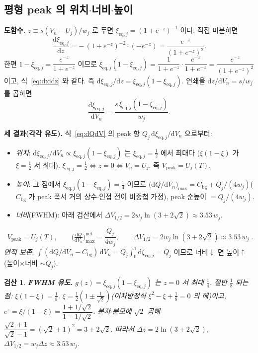 \documentclass[11pt,a4paper]{article}
\newtheorem*{verifybox}{검산}
\newcommand{\dd}{\mathrm{d}}
\newcommand{\eq}{\mathrm{eq}}
\newcommand{\bg}{\mathrm{bg}}
\newcommand{\peak}{\mathrm{peak}}
\begin{document}
\subsection{평형 peak 의 위치$\cdot$너비$\cdot$높이}
\textbf{도함수.} $z\equiv s(V_n-U_j)/w_j$ 로 두면 $\xi_{\eq,j}=(1+e^{-z})^{-1}$ 이다. 직접 미분하면
\begin{equation}
\frac{\dd\xi_{\eq,j}}{\dd z}=-\,(1+e^{-z})^{-2}\cdot(-e^{-z})=\frac{e^{-z}}{(1+e^{-z})^2}.
\label{eq:dxidz}
\end{equation}
한편 $1-\xi_{\eq,j}=\dfrac{e^{-z}}{1+e^{-z}}$ 이므로 $\xi_{\eq,j}(1-\xi_{\eq,j})=\dfrac{1}{1+e^{-z}}\cdot
\dfrac{e^{-z}}{1+e^{-z}}=\dfrac{e^{-z}}{(1+e^{-z})^2}$ 이고, 식~\eqref{eq:dxidz} 와 같다. 즉
$\dd\xi_{\eq,j}/\dd z=\xi_{\eq,j}(1-\xi_{\eq,j})$. 연쇄율 $\dd z/\dd V_n=s/w_j$ 를 곱하면
\begin{equation}
\frac{\dd\xi_{\eq,j}}{\dd V_n}=\frac{s\,\xi_{\eq,j}(1-\xi_{\eq,j})}{w_j}.
\label{eq:dxidV}
\end{equation}

\textbf{세 결과(각각 유도).} 식~\eqref{eq:dQdV} 의 peak 항 $Q_j\,\dd\xi_{\eq,j}/\dd V_n$ 으로부터:
\begin{itemize}[leftmargin=1.6em,itemsep=2pt]
\item \emph{위치}: $\dd\xi_{\eq,j}/\dd V_n\propto\xi_{\eq,j}(1-\xi_{\eq,j})$ 는 $\xi_{\eq,j}=\tfrac12$ 에서 최대다
  ($\xi(1-\xi)$ 가 $\xi=\tfrac12$ 서 최대). $\xi_{\eq,j}=\tfrac12\Leftrightarrow z=0\Leftrightarrow V_n=U_j$. 즉
  $V_\peak=U_j(T)$.
\item \emph{높이}: 그 점에서 $\xi_{\eq,j}(1-\xi_{\eq,j})=\tfrac14$ 이므로
  $\big(\dd Q/\dd V_n\big)_{\max}=C_\bg+Q_j/(4w_j)$($C_\bg$ 가 peak 폭서 거의 상수$\cdot$인접 전이 비중첩 가정), peak 순높이 $=Q_j/(4w_j)$.
\item \emph{너비}(FWHM): 아래 검산에서 $\Delta V_{1/2}=2w_j\ln(3+2\sqrt2)\approx3.53\,w_j$.
\end{itemize}
\begin{equation}
\boxed{\;V_\peak=U_j(T),\qquad \Big(\tfrac{\dd Q}{\dd V_n}\Big)^{\text{net}}_{\max}=\frac{Q_j}{4w_j},\qquad
\Delta V_{1/2}=2w_j\ln(3+2\sqrt2)\approx3.53\,w_j\;.}
\label{eq:eqpeak}
\end{equation}
\emph{면적 보존}: $\int(\dd Q/\dd V_n-C_\bg)\,\dd V_n=Q_j\int_0^1\dd\xi_{\eq,j}=Q_j$ 이므로 너비$\downarrow$ 면
높이$\uparrow$(높이$\times$너비 $\sim Q_j$).

\begin{verifybox}
\textbf{FWHM 유도.} $g(z)=\xi_{\eq,j}(1-\xi_{\eq,j})$ 는 $z=0$ 서 최대 $\tfrac14$. 절반 $\tfrac18$ 되는 점:
$\xi(1-\xi)=\tfrac18$. $\xi=\tfrac12(1\pm\tfrac1{\sqrt2})$(이차방정식 $\xi^2-\xi+\tfrac18=0$ 의 해)이고,
$e^z=\xi/(1-\xi)=\dfrac{1+1/\sqrt2}{1-1/\sqrt2}$. 분자$\cdot$분모에 $\sqrt2$ 곱해 $\dfrac{\sqrt2+1}{\sqrt2-1}
=(\sqrt2+1)^2=3+2\sqrt2$. 따라서 $\Delta z=2\ln(3+2\sqrt2)$, $\Delta V_{1/2}=w_j\Delta z\approx3.53\,w_j$.
\end{verifybox}
\end{document}

